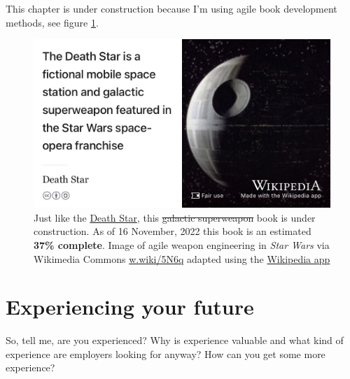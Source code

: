 \documentclass[
]{book}
\begin{document}
This chapter is under construction because I'm using agile book development methods, see figure \ref{fig:deathstar-fig}.

\begin{figure}

{\centering \includegraphics[width=0.99\linewidth]{images/DeathStar2} 

}

\caption{Just like the \href{https://en.wikipedia.org/wiki/Death_Star}{Death Star}, this \sout{galactic superweapon} book is under construction. As of 16 November, 2022 this book is an estimated \textbf{37\% complete}. Image of agile weapon engineering in \emph{Star Wars} via Wikimedia Commons \href{https://w.wiki/5N6q}{w.wiki/5N6q} adapted using the \href{https://apps.apple.com/gb/app/wikipedia/id324715238}{Wikipedia app}}\label{fig:deathstar-fig}
\end{figure}



\hypertarget{experiencing}{%
\chapter{Experiencing your future}\label{experiencing}}

So, tell me, are you experienced? Why is experience valuable and what kind of experience are employers looking for anyway? How can you get some more experience? 🤔
\end{document}

